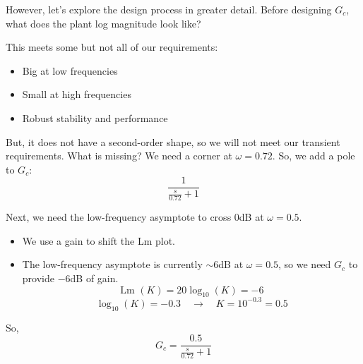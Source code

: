 \documentclass{book}
\newcommand{\Lm}{\textrm{Lm }}
\begin{document}
\begin{center}
\end{center}

\begin{minipage}{0.49\textwidth}
	However, let's explore the design process in greater detail. Before designing $ G_c $, what does the plant log magnitude look like?\vspace{1em}
	
	This meets some but not all of our requirements:
	\begin{itemize}
		\item Big at low frequencies
		\item Small at high frequencies
		\item Robust stability and performance
	\end{itemize}	
	
	But, it does not have a second-order shape, so we will not meet our transient requirements. What is missing? We need a corner at $ \omega = 0.72 $. So, we add a pole to $ G_c $:
	\[ \frac{1}{\frac{s}{0.72}+1} \]
	
	Next, we need the low-frequency asymptote to cross 0dB at $ \omega=0.5 $.
	\begin{itemize}
		\item We use a gain to shift the Lm plot.
		\item The low-frequency asymptote is currently $ \sim6 $dB at $ \omega=0.5 $, so we need $ G_c $ to provide $ -6$dB of gain.
		\[ \Lm(K) = 20\log_{10}(K) = -6 \]
		\[ \log_{10}(K) = -0.3 \quad\rightarrow\quad K = 10^{-0.3} = 0.5 \]	 
	\end{itemize}
	
	So,
	\[ \boxed{G_c = \frac{0.5}{\frac{s}{0.72}+1}} \]
\end{minipage}
\end{document}
